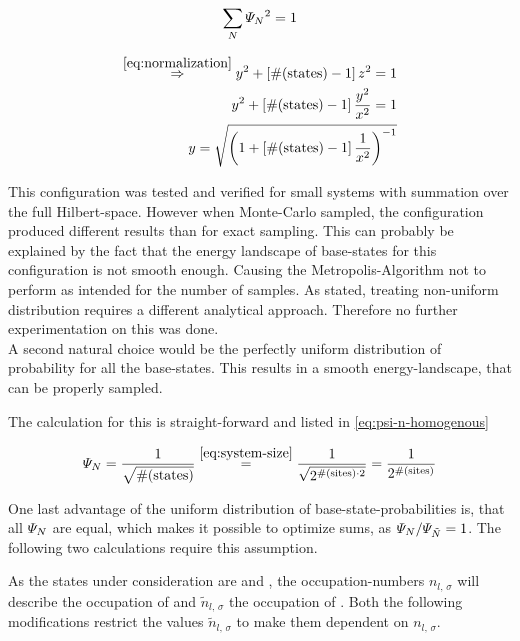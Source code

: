 \begin{equation}
    \label{eq:normalization}
    \lsum[N] \psiN{}^2 = 1
\end{equation}

\begin{equation}
    \label{eq:psi-n-concentrated}
    \begin{split}
        \stackrel{\ref{eq:normalization}}{\Rightarrow} y^2 + \left[\text{\#}(\text{states}) - 1 \right] z^2 = 1\\
        y^2 + \left[\text{\#}(\text{states}) - 1 \right] \frac{y^2}{x^2} = 1\\
        y = \sqrt{\left(1+\left[\text{\#}(\text{states}) - 1 \right]\frac{1}{x^2}\right)^{-1}}
    \end{split}
\end{equation}

This configuration was tested and verified for small systems with summation over the full Hilbert-space. 
However when Monte-Carlo sampled, the configuration produced different results than for exact sampling.
This can probably be explained by the fact that the energy landscape of base-states for this configuration is not smooth enough. 
Causing the Metropolis-Algorithm not to perform as intended for the number of samples.
As stated, treating non-uniform distribution requires a different analytical approach. Therefore no further experimentation on this was done.\\

A second natural choice would be the perfectly uniform distribution of probability for all the base-states. 
This results in a smooth energy-landscape, that can be properly sampled. 

The calculation for this is straight-forward and listed in \autoref{eq:psi-n-homogenous}

\begin{equation}
    \label{eq:psi-n-homogenous}
    \psiN{} = \frac{1}{\sqrt{\text{\#}(\text{states})}} \stackrel{\ref{eq:system-size}}{=} \frac{1}{\sqrt{2^{\text{\#}(\text{sites}) \cdot 2}}} = \frac{1}{2^{\text{\#}(\text{sites})}}
\end{equation}

One last advantage of the uniform distribution of base-state-probabilities is, that all $\psiN$ are equal, which makes it possible to optimize sums, as $\psiN{}/\psiN[\tilde{N}]{} = 1$.
The following two calculations require this assumption.

As the states under consideration are \ketN[N] and , the occupation-numbers $n_{l,\,\sigma}$ will describe the occupation of \ketN[N] and $\tilde{n}_{l,\,\sigma}$ the occupation of .
Both the following modifications restrict the values $\tilde{n}_{l,\,\sigma}$ to make them dependent on $n_{l,\,\sigma}$.

